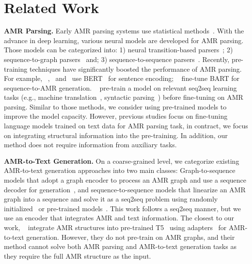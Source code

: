 \documentclass[11pt]{article}
\begin{document}
\section{Related Work}
\textbf{AMR Parsing.}
Early AMR parsing systems use statistical methods~\cite{flanigan-etal-2014-discriminative,flanigan-etal-2016-cmu,wang-etal-2015-boosting,wang-etal-2015-transition}. 
With the advance in deep learning, various neural models are developed for AMR parsing. Those models can be categorized into: 1) neural transition-based parsers~\cite{ballesteros-al-onaizan-2017-amr,liu-etal-2018-amr,fernandez-astudillo-etal-2020-transition,zhou-etal-2021-amr}; 2) sequence-to-graph parsers~\cite{zhang-etal-2019-amr,DBLP:journals/corr/abs-2010-12676,cai-lam-2020-amr} and; 3) sequence-to-sequence parsers~\cite{konstas2017neural,peng-etal-2017-addressing,peng-etal-2018-sequence,zhang-etal-2019-broad,xu-etal-2020-improving,Bevilacqua_Blloshmi_Navigli_2021}.
Recently, pre-training techniques have significantly boosted the performance of AMR parsing. 
For example, ~\citet{TitovL18},~\citet{zhang-etal-2019-amr,zhang-etal-2019-broad} and~\citet{cai-lam-2020-amr} use BERT~\cite{devlin-etal-2019-bert} for sentence encoding;
~\citet{Bevilacqua_Blloshmi_Navigli_2021} fine-tune BART for sequence-to-AMR generation.
~\citet{xu-etal-2020-improving} pre-train a model on relevant seq2seq learning tasks (e.g., machine translation~\cite{Bahdanau2015NeuralMT}, syntactic parsing~\cite{zhu-etal-2013-fast}) before fine-tuning on AMR parsing.
Similar to those methods, we consider using pre-trained models to improve the model capacity. 
However, previous studies focus on fine-tuning language models trained on text data for AMR parsing task, in contract, we focus on integrating structural information into the pre-training.
In addition, our method does not require information from auxiliary tasks.

\noindent\textbf{AMR-to-Text Generation.}
On a coarse-grained level, we categorize existing AMR-to-text generation approaches into two main classes:
Graph-to-sequence models that adopt a graph encoder to process an AMR graph and use a sequence decoder for generation~\cite{beck2018graph,damonte-cohen-2019-structural,zhu2019modeling}, and sequence-to-sequence models that linearize an AMR graph into a sequence and solve it as a seq2seq problem using randomly initialized~\cite{konstas2017neural} or pre-trained models~\cite{mager-etal-2020-gpt,ribeiro-etal-2021-investigating,Bevilacqua_Blloshmi_Navigli_2021}.
This work follows a seq2seq manner, but we use an encoder that integrates AMR and text information.
The closest to our work, ~\citet{Ribeiro2021StructuralAI} integrate AMR structures into pre-trained T5~\cite{JMLR:v21:20-074}  using adapters~\cite{Houlsby2019ParameterEfficientTL} for AMR-to-text generation.
However, they do not pre-train on AMR graphs, and their method cannot solve both AMR parsing and AMR-to-text generation tasks as they require the full AMR structure as the input.
\end{document}
